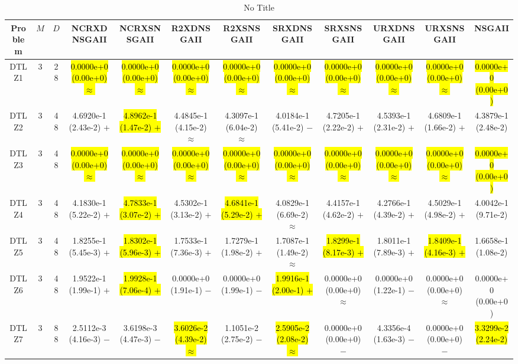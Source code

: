 \documentclass[journal]{IEEEtran}
\begin{document}
\begin{table*}[htbp]
\renewcommand{\arraystretch}{1.2}
\centering
\caption{No Title}
\begin{tabular}{cccccccccccc}
\toprule
Problem&$M$&$D$&NCRXDNSGAII&NCRXSNSGAII&R2XDNSGAII&R2XSNSGAII&SRXDNSGAII&SRXSNSGAII&URXDNSGAII&URXSNSGAII&NSGAII\\
\midrule
\multirow{1}{*}{DTLZ1}&3&28&\hl{0.0000e+0 (0.00e+0) $\approx$}&\hl{0.0000e+0 (0.00e+0) $\approx$}&\hl{0.0000e+0 (0.00e+0) $\approx$}&\hl{0.0000e+0 (0.00e+0) $\approx$}&\hl{0.0000e+0 (0.00e+0) $\approx$}&\hl{0.0000e+0 (0.00e+0) $\approx$}&\hl{0.0000e+0 (0.00e+0) $\approx$}&\hl{0.0000e+0 (0.00e+0) $\approx$}&\hl{0.0000e+0 (0.00e+0)}\\
\hline
\multirow{1}{*}{DTLZ2}&3&48&4.6920e-1 (2.43e-2) $+$&\hl{4.8962e-1 (1.47e-2) $+$}&4.4845e-1 (4.15e-2) $\approx$&4.3097e-1 (6.04e-2) $\approx$&4.0184e-1 (5.41e-2) $-$&4.7205e-1 (2.22e-2) $+$&4.5393e-1 (2.31e-2) $+$&4.6809e-1 (1.66e-2) $+$&4.3879e-1 (2.48e-2)\\
\hline
\multirow{1}{*}{DTLZ3}&3&48&\hl{0.0000e+0 (0.00e+0) $\approx$}&\hl{0.0000e+0 (0.00e+0) $\approx$}&\hl{0.0000e+0 (0.00e+0) $\approx$}&\hl{0.0000e+0 (0.00e+0) $\approx$}&\hl{0.0000e+0 (0.00e+0) $\approx$}&\hl{0.0000e+0 (0.00e+0) $\approx$}&\hl{0.0000e+0 (0.00e+0) $\approx$}&\hl{0.0000e+0 (0.00e+0) $\approx$}&\hl{0.0000e+0 (0.00e+0)}\\
\hline
\multirow{1}{*}{DTLZ4}&3&48&4.1830e-1 (5.22e-2) $+$&\hl{4.7833e-1 (3.07e-2) $+$}&4.5302e-1 (3.13e-2) $+$&\hl{4.6841e-1 (5.29e-2) $+$}&4.0829e-1 (6.69e-2) $\approx$&4.4157e-1 (4.62e-2) $+$&4.2766e-1 (4.39e-2) $+$&4.5029e-1 (4.98e-2) $+$&4.0042e-1 (9.71e-2)\\
\hline
\multirow{1}{*}{DTLZ5}&3&48&1.8255e-1 (5.45e-3) $+$&\hl{1.8302e-1 (5.96e-3) $+$}&1.7533e-1 (7.36e-3) $+$&1.7279e-1 (1.98e-2) $+$&1.7087e-1 (1.49e-2) $\approx$&\hl{1.8299e-1 (8.17e-3) $+$}&1.8011e-1 (7.89e-3) $+$&\hl{1.8409e-1 (4.16e-3) $+$}&1.6658e-1 (1.08e-2)\\
\hline
\multirow{1}{*}{DTLZ6}&3&48&1.9522e-1 (1.99e-1) $+$&\hl{1.9928e-1 (7.06e-4) $+$}&0.0000e+0 (1.91e-1) $-$&0.0000e+0 (1.99e-1) $-$&\hl{1.9916e-1 (2.00e-1) $+$}&0.0000e+0 (0.00e+0) $\approx$&0.0000e+0 (1.22e-1) $-$&0.0000e+0 (0.00e+0) $\approx$&0.0000e+0 (0.00e+0)\\
\hline
\multirow{1}{*}{DTLZ7}&3&88&2.5112e-3 (4.16e-3) $-$&3.6198e-3 (4.47e-3) $-$&\hl{3.6026e-2 (4.39e-2) $\approx$}&1.1051e-2 (2.75e-2) $-$&\hl{2.5905e-2 (2.08e-2) $\approx$}&0.0000e+0 (0.00e+0) $-$&4.3356e-4 (1.63e-3) $-$&0.0000e+0 (0.00e+0) $-$&\hl{3.3299e-2 (2.24e-2)}\\

\end{tabular}
\end{table*}
\end{document}
